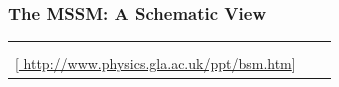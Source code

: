 \documentclass[10pt,aspectratio=169]{beamer}
\begin{document}
\begin{frame}
  \frametitle{The MSSM: A Schematic View}
  \begin{tabularx}{\textwidth}{VVV}
    \begin{tabular}{c}
    \includegraphics[width=0.25\textwidth]{susyparticles_sm_cropped} \\
    \phantom{\tiny Caption}
  \end{tabular} &
    \hspace{15pt}
     &
    \begin{tabular}{c}
      \includegraphics[width=0.5\textwidth]{susyparticles_sm} \\
      {\tiny [\href{http://www.physics.gla.ac.uk/ppt/bsm.htm}{%
      http://www.physics.gla.ac.uk/ppt/bsm.htm}] }
    \end{tabular}
  \end{tabularx}
\end{frame}
\end{document}
